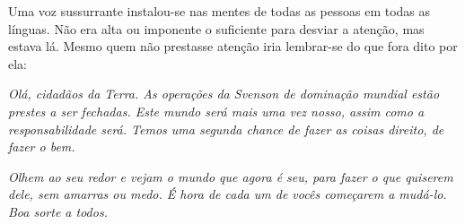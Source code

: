 \espaco


Uma voz sussurrante instalou-se nas mentes de todas as pessoas em todas
as línguas. Não era alta ou imponente o suficiente para desviar a
atenção, mas estava lá. Mesmo quem não prestasse atenção iria lembrar-se
do que fora dito por ela:

\textit{Olá, cidadãos da Terra. As operações da Svenson de dominação
mundial estão prestes a ser fechadas. Este mundo será mais uma vez
nosso, assim como a responsabilidade será. Temos uma segunda chance de
fazer as coisas direito, de fazer o bem.}

\textit{Olhem ao seu redor e vejam o mundo que agora é seu, para fazer o que
quiserem dele, sem amarras ou medo. É hora de cada um de vocês começarem
a mudá-lo. Boa sorte a todos.}
